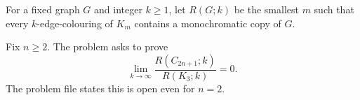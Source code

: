 For a fixed graph $G$ and integer $k\ge 1$, let $R(G;k)$ be the smallest $m$ such that every $k$-edge-colouring of $K_m$ contains a monochromatic copy of $G$.

Fix $n\ge 2$. The problem asks to prove
\[
\lim_{k\to\infty} \frac{R(C_{2n+1};k)}{R(K_3;k)} = 0.
\]
The problem file states this is open even for $n=2$.
